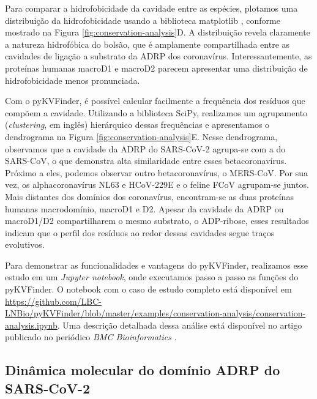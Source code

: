 \documentclass[Portugues]{phdquali}
\begin{document}
Para comparar a hidrofobicidade da cavidade entre as espécies, plotamos uma distribuição da hidrofobicidade usando a biblioteca matplotlib \cite{matplotlib}, conforme mostrado na Figura \ref{fig:conservation-analysis}D. A distribuição revela claramente a natureza hidrofóbica do bolsão, que é amplamente compartilhada entre as cavidades de ligação a substrato da ADRP dos coronavírus. Interessantemente, as proteínas humanas macroD1 e macroD2 parecem apresentar uma distribuição de hidrofobicidade menos pronunciada.

Com o pyKVFinder, é possível calcular facilmente a frequência dos resíduos que compõem a cavidade. Utilizando a biblioteca SciPy\cite{scipy}, realizamos um agrupamento (\textit{clustering}, em inglês) hierárquico dessas frequências e apresentamos o dendrograma na Figura \ref{fig:conservation-analysis}E. Nesse dendrograma, observamos que a cavidade da ADRP do SARS-CoV-2 agrupa-se com a do SARS-CoV, o que demonstra alta similaridade entre esses betacoronavírus. Próximo a eles, podemos observar outro betacoronavírus, o MERS-CoV. Por sua vez, os alphacoronavírus NL63 e HCoV-229E e o feline FCoV agrupam-se juntos. Mais distantes dos domínios dos coronavírus, encontram-se as duas proteínas humanas macrodomínio, macroD1 e D2. Apesar da cavidade da ADRP ou macroD1/D2 compartilharem o mesmo substrato, o ADP-ribose, esses resultados indicam que o perfil dos resíduos ao redor dessas cavidades segue traços evolutivos.

Para demonstrar as funcionalidades e vantagens do pyKVFinder, realizamos esse estudo em um \textit{Jupyter notebook}, onde executamos passo a passo as funções do pyKVFinder. O notebook com o caso de estudo completo está disponível em \url{https://github.com/LBC-LNBio/pyKVFinder/blob/master/examples/conservation-analysis/conservation-analysis.ipynb}. Uma descrição detalhada dessa análise está disponível no artigo publicado no periódico \textit{BMC Bioinformatics} \cite{guerra2021}. 

\subsection{Dinâmica molecular do domínio ADRP do SARS-CoV-2}
\end{document}
